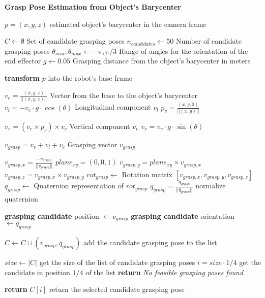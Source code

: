 \begin{algorithm}[H]
    \caption{\textbf{Grasp Pose Estimation from Object's Barycenter}}
    \label{alg:grasping}
    \begin{algorithmic}[1]
    \Require $p = (x, y, z)$ estimated object's barycenter in the camera frame

    \State $C \gets \emptyset$ \Comment Set of candidate grasping poses
    \State $n_{candidates} \gets 50$ \Comment Number of candidate grasping poses
    \State $\theta_{min}, \theta_{max} \gets -\pi, \pi/3$ \Comment Range of angles for the orientation of the end effector
    \State $g \gets 0.05$ \Comment Grasping distance from the object's barycenter in meters

    \State \textbf{transform} $p$ into the robot's base frame

        \State $v_{c} = \frac{(x,y,z)}{||(x,y,z)||}$ \Comment Vector from the base to the object's barycenter
        \State $v_{l} = -v_{c} \cdot g \cdot \cos(\theta)$ \Comment Longitudinal component $v_l$
        \State $p_v = \frac{(x, y, 0)}{||(x,y)||}$ 

        \State $v_v = (v_c \times p_v) \times v_c$ \Comment Vertical component $v_v$
        \State $v_v = v_v \cdot g \cdot \sin(\theta)$
        
        \State $v_{grasp} = v_v + v_l + v_c$ \Comment Grasping vector $v_{grasp}$
        
        \State $v_{grasp, x} = \frac{-v_{grasp}}{||v_{grasp}||}$ 
        \State $plane_{xy} = (0, 0, 1)$ 
        \State $v_{grasp, y} = plane_{xy} \times v_{grasp, x}$
        \State $v_{grasp, z} = v_{grasp, x} \times v_{grasp, y}$
        \State $rot_{grasp} \gets$ Rotation matrix $\left[v_{grasp, x}, v_{grasp, y}, v_{grasp, z}\right]$
        \State $q_{grasp} \gets$ Quaternion representation of $rot_{grasp}$
        \State $q_{grasp} = \frac{q_{grasp}}{||q_{grasp}||} $   \Comment normalize quaternion
        
        \State \textbf{grasping candidate} position $\gets v_{grasp}$
        \State \textbf{grasping candidate} orientation $\gets q_{grasp}$

            \State $C \gets C \cup (v_{grasp}, q_{grasp})$ \Comment add the candidate grasping pose to the list
        \EndIf
    \EndFor

    \State $size \gets |C|$ \Comment get the size of the list of candidate grasping poses
        \State $i = size \cdot 1/4$ \Comment get the candidate in position $1/4$ of the list
    \Else 
        \State \textbf{return} \textit{No feasible grasping poses found}
    \EndIf 

    \State \textbf{return} $C[i]$ \Comment return the selected candidate grasping pose

    \end{algorithmic}
\end{algorithm}


